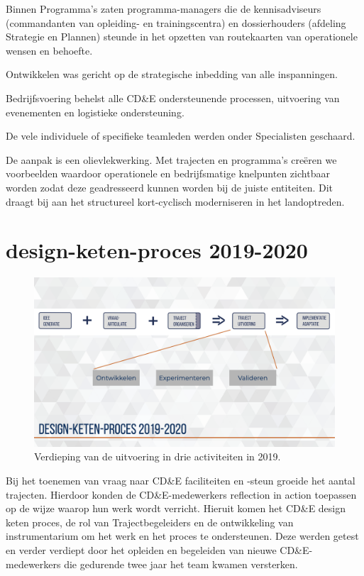 \documentclass[
]{book}
\begin{document}
Binnen Programma's zaten programma-managers die de kennisadviseurs (commandanten van opleiding- en trainingscentra) en dossierhouders (afdeling Strategie en Plannen) steunde in het opzetten van routekaarten van operationele wensen en behoefte.

Ontwikkelen was gericht op de strategische inbedding van alle inspanningen.

Bedrijfsvoering behelst alle CD\&E ondersteunende processen, uitvoering van evenementen en logistieke ondersteuning.

De vele individuele of specifieke teamleden werden onder Specialisten geschaard.

De aanpak is een olievlekwerking. Met trajecten en programma's creëren we voorbeelden waardoor operationele en bedrijfsmatige knelpunten zichtbaar worden zodat deze geadresseerd kunnen worden bij de juiste entiteiten. Dit draagt bij aan het structureel kort-cyclisch moderniseren in het landoptreden.

\hypertarget{design-keten-proces-2019-2020}{%
\section{design-keten-proces 2019-2020}\label{design-keten-proces-2019-2020}}

\begin{figure}

{\centering \includegraphics[width=0.5\linewidth]{data/keynote-slides/20200430-CDE-Designprocess/20200430-CDE-Designprocess.026} 

}

\caption{Verdieping van de uitvoering in drie activiteiten in 2019. }\label{fig:unnamed-chunk-23}
\end{figure}

Bij het toenemen van vraag naar CD\&E faciliteiten en -steun groeide het aantal trajecten. Hierdoor konden de CD\&E-medewerkers reflection in action toepassen op de wijze waarop hun werk wordt verricht. Hieruit komen het CD\&E design keten proces, de rol van Trajectbegeleiders en de ontwikkeling van instrumentarium om het werk en het proces te ondersteunen. Deze werden getest en verder verdiept door het opleiden en begeleiden van nieuwe CD\&E-medewerkers die gedurende twee jaar het team kwamen versterken.
\end{document}
